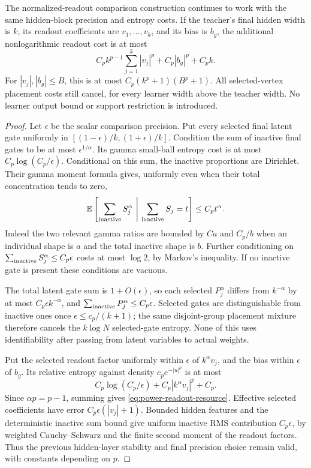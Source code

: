 \begin{lemma}
\label{lem:power-readout-comparison}
The normalized-readout comparison construction continues to work with the same hidden-block precision and entropy costs. If the teacher's final hidden width is $k$, its readout coefficients are $v_1,\ldots,v_k$, and its bias is $b_g$, the additional nonlogarithmic readout cost is at most
\begin{equation}
 C_p k^{p-1}\sum_{j=1}^k|v_j|^p+C_p|b_g|^p+C_pk.
 \label{eq:power-readout-resource}
\end{equation}
For $|v_j|,|b_g|\le B$, this is at most $C_p(k^p+1)(B^p+1)$. All selected-vertex placement costs still cancel, for every learner width above the teacher width. No learner output bound or support restriction is introduced.
\end{lemma}
\begin{proof}
Let $\epsilon$ be the scalar comparison precision. Put every selected final latent gate uniformly in $[(1-\epsilon)/k,(1+\epsilon)/k]$. Condition the sum of inactive final gates to be at most $\epsilon^{1/\alpha}$. Its gamma small-ball entropy cost is at most $C_p\log(C_p/\epsilon)$. Conditional on this sum, the inactive proportions are Dirichlet. Their gamma moment formula gives, uniformly even when their total concentration tends to zero,
\[
 \mathbb E\left[\sum_{\rm inactive}S_j^\alpha\ 
                      \middle|\ \sum_{\rm inactive}S_j=t\right]
 \le C_p t^\alpha.
\]
Indeed the two relevant gamma ratios are bounded by $Ca$ and $C_p/b$ when an individual shape is $a$ and the total inactive shape is $b$. Further conditioning on
$\sum_{\rm inactive}S_j^\alpha\le C_p\epsilon$
costs at most $\log2$, by Markov's inequality. If no inactive gate is present these conditions are vacuous.

The total latent gate sum is $1+O(\epsilon)$, so each selected $P_j^\alpha$ differs from $k^{-\alpha}$ by at most $C_p\epsilon k^{-\alpha}$, and
$\sum_{\rm inactive}P_j^\alpha\le C_p\epsilon$.
Selected gates are distinguishable from inactive ones once $\epsilon\le c_p/(k+1)$; the same disjoint-group placement mixture therefore cancels the $k\log N$ selected-gate entropy. None of this uses identifiability after passing from latent variables to actual weights.

Put the selected readout factor uniformly within $\epsilon$ of $k^\alpha v_j$, and the bias within $\epsilon$ of $b_g$. Its relative entropy against density $c_p e^{-|u|^p}$ is at most
\[
 C_p\log(C_p/\epsilon)+C_p|k^\alpha v_j|^p+C_p.
\]
Since $\alpha p=p-1$, summing gives \eqref{eq:power-readout-resource}. Effective selected coefficients have error $C_p\epsilon(|v_j|+1)$. Bounded hidden features and the deterministic inactive sum bound give uniform inactive RMS contribution $C_p\epsilon$, by weighted Cauchy--Schwarz and the finite second moment of the readout factors. Thus the previous hidden-layer stability and final precision choice remain valid, with constants depending on $p$.
\end{proof}

